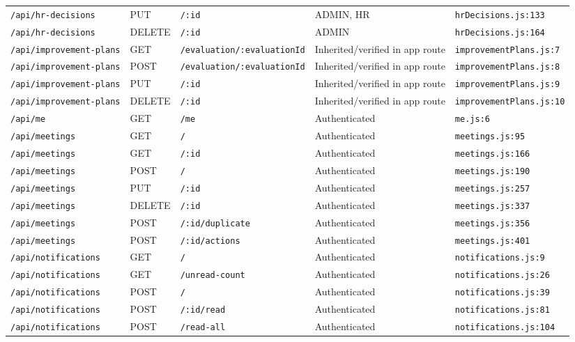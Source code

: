 \begin{landscape}
\begin{longtable}{p{}p{}p{}p{}p{}}
\texttt{/api/hr-decisions} & PUT & \texttt{/:id} & ADMIN,  HR & \texttt{hrDecisions.js:133}\\
\texttt{/api/hr-decisions} & DELETE & \texttt{/:id} & ADMIN & \texttt{hrDecisions.js:164}\\
\texttt{/api/improvement-plans} & GET & \texttt{/evaluation/:evaluationId} & Inherited/verified in app route & \texttt{improvementPlans.js:7}\\
\texttt{/api/improvement-plans} & POST & \texttt{/evaluation/:evaluationId} & Inherited/verified in app route & \texttt{improvementPlans.js:8}\\
\texttt{/api/improvement-plans} & PUT & \texttt{/:id} & Inherited/verified in app route & \texttt{improvementPlans.js:9}\\
\texttt{/api/improvement-plans} & DELETE & \texttt{/:id} & Inherited/verified in app route & \texttt{improvementPlans.js:10}\\
\texttt{/api/me} & GET & \texttt{/me} & Authenticated & \texttt{me.js:6}\\
\texttt{/api/meetings} & GET & \texttt{/} & Authenticated & \texttt{meetings.js:95}\\
\texttt{/api/meetings} & GET & \texttt{/:id} & Authenticated & \texttt{meetings.js:166}\\
\texttt{/api/meetings} & POST & \texttt{/} & Authenticated & \texttt{meetings.js:190}\\
\texttt{/api/meetings} & PUT & \texttt{/:id} & Authenticated & \texttt{meetings.js:257}\\
\texttt{/api/meetings} & DELETE & \texttt{/:id} & Authenticated & \texttt{meetings.js:337}\\
\texttt{/api/meetings} & POST & \texttt{/:id/duplicate} & Authenticated & \texttt{meetings.js:356}\\
\texttt{/api/meetings} & POST & \texttt{/:id/actions} & Authenticated & \texttt{meetings.js:401}\\
\texttt{/api/notifications} & GET & \texttt{/} & Authenticated & \texttt{notifications.js:9}\\
\texttt{/api/notifications} & GET & \texttt{/unread-count} & Authenticated & \texttt{notifications.js:26}\\
\texttt{/api/notifications} & POST & \texttt{/} & Authenticated & \texttt{notifications.js:39}\\
\texttt{/api/notifications} & POST & \texttt{/:id/read} & Authenticated & \texttt{notifications.js:81}\\
\texttt{/api/notifications} & POST & \texttt{/read-all} & Authenticated & \texttt{notifications.js:104}\\

\end{longtable}
\end{landscape}
